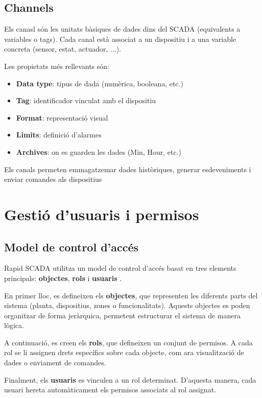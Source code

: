 \documentclass[12pt,a4paper]{report}
\begin{document}
\subsection{Channels}

Els canasl són les unitats bàsiques de dades dins del SCADA (equivalents a variables o tags). Cada canal està associat a un dispositiu i a una variable concreta (sensor, estat, actuador, ...).

Les propietats més rellevants són:

\begin{itemize}
    \item \textbf{Data type}: tipus de dada (numèrica, booleana, etc.)
    \item \textbf{Tag}: identificador vinculat amb el dispositiu
    \item \textbf{Format}: representació visual
    \item \textbf{Limits}: definició d'alarmes
    \item \textbf{Archives}: on es guarden les dades (Min, Hour, etc.)
\end{itemize}

Els canals permeten emmagatzemar dades històriques, generar esdeveniments i enviar comandes als dispositius

\section{Gestió d'usuaris i permisos}

\subsection{Model de control d'accés}

Rapid SCADA utilitza un model de control d'accés basat en tres elements principals: \textbf{objectes}, \textbf{rols} i \textbf{usuaris} \cite{rapidscada_user_management}.

En primer lloc, es defineixen els \textbf{objectes}, que representen les diferents parts del sistema (planta, dispositius, zones o funcionalitats). Aquests objectes es poden organitzar de forma jeràrquica, permetent estructurar el sistema de manera lògica.

A continuació, es creen els \textbf{rols}, que defineixen un conjunt de permisos. A cada rol se li assignen drets específics sobre cada objecte, com ara visualització de dades o enviament de comandes.

Finalment, els \textbf{usuaris} es vinculen a un rol determinat. D'aquesta manera, cada usuari hereta automàticament els permisos associats al rol assignat.
\end{document}
